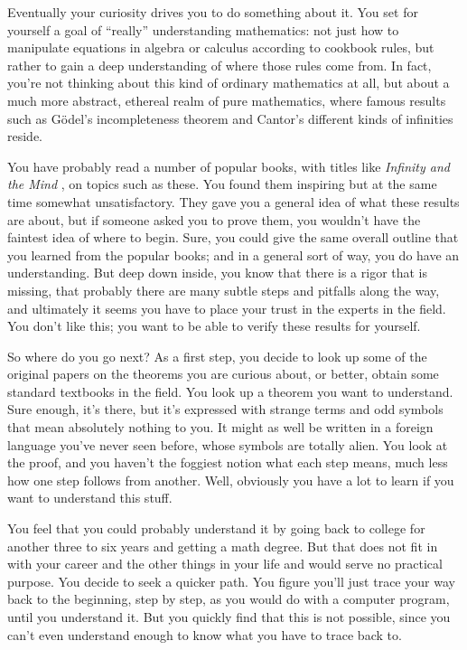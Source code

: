 Eventually your curiosity drives you to do something about it.
You set for yourself a goal of ``really'' understanding mathematics:  not just
how to manipulate equations in algebra or calculus according to cookbook
rules, but rather to gain a deep understanding of where those rules come from.
In fact, you're not thinking about this kind of ordinary mathematics at all,
but about a much more abstract, ethereal realm of pure mathematics, where
famous results such as G\"{o}del's incompleteness theorem and Cantor's different kinds of infinities
reside.

You have probably read a number of popular books, with titles like {\em
Infinity and the Mind} \cite{Rucker}, on topics such as
these.  You found them inspiring but at the same time somewhat
unsatisfactory.  They gave you a general idea of what these results are about,
but if someone asked you to prove them, you wouldn't have the faintest idea of
where to begin.   Sure, you could give the same overall outline that you
learned from the popular books; and in a general sort of way, you do have an
understanding.  But deep down inside, you know that there is a rigor that is
missing, that probably there are many subtle steps and pitfalls along the way,
and ultimately it seems you have to place your trust in the experts in the
field.  You don't like this; you want to be able to verify these results for
yourself.

So where do you go next?  As a first step, you decide to look up some of the
original papers on the theorems you are curious about, or better, obtain some
standard textbooks in the field.  You look up a theorem you want to
understand.  Sure enough, it's there, but it's expressed with strange
terms and odd symbols that mean absolutely nothing to you.  It might as well be written in
a foreign language you've never seen before, whose symbols are totally alien.
You look at the proof, and you haven't the foggiest notion what each step
means, much less how one step follows from another.  Well, obviously you have
a lot to learn if you want to understand this stuff.

You feel that you could probably understand it by
going back to college for another three to six years and getting a math
degree.  But that does not fit in with your career and the other things in
your life and would serve no practical purpose.  You decide to seek a quicker
path.  You figure you'll just trace your way back to the beginning, step by
step, as you would do with a computer program, until you understand it.  But
you quickly find that this is not possible, since you can't even understand
enough to know what you have to trace back to.

